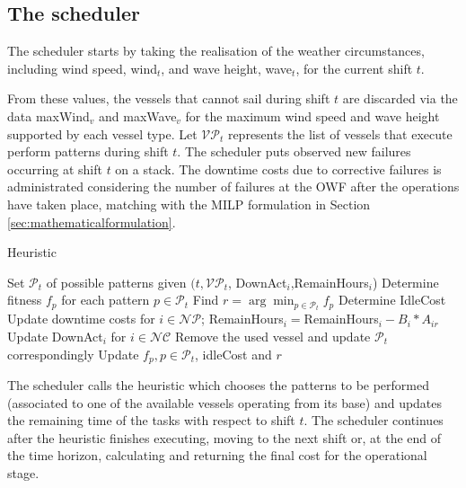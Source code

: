 \subsection{The scheduler}
The scheduler starts by taking the realisation of the weather circumstances, including wind speed, wind$_t$, and wave height, wave$_t$, for the current shift $t$. 


From these values, the vessels that cannot sail during shift $t$ are discarded via the data maxWind$_v$ and maxWave$_v$ for the maximum wind speed and wave height supported by each vessel type. Let $\mathcal{VP}_t$ represents the list of vessels that execute perform patterns during shift $t$. The scheduler puts observed new failures occurring at shift $t$ on a stack. The downtime costs due to corrective failures is administrated considering the number of failures at the OWF after the operations have taken place, matching with the MILP formulation in Section \ref{sec:mathematicalformulation}.

\begin{algorithm}[h]
	\caption{Heuristic}
	\label{alg:heuristic}
	\begin{algorithmic}
		\medskip

			\STATE Set $\mathcal{P}_t$ of possible patterns 
			given $(t,\mathcal{VP}_t$,  DownAct$_i$,RemainHours$_i$)\label{alg:line:allpatcosts}
			\STATE Determine fitness $f_p$ for each pattern $p \in\mathcal{P}_t$
			\STATE Find $r=\arg\min_{p\in \mathcal{P}_t} f_p$
			\STATE Determine IdleCost
				\STATE Update downtime costs for $i \in \mathcal{NP}$;
				\STATE RemainHours$_i = $RemainHours$_i -B_i*A_{ir}$
				\STATE Update DownAct$_i$ for $i\in \mathcal{NC}$
				\STATE Remove the used vessel and update $\mathcal{P}_t$ correspondingly
				\STATE Update $f_p, p\in \mathcal{P}_t$, idleCost and $r$
				\ENDFOR
			\ENDWHILE

		\vskip 5pt
	\end{algorithmic}
\end{algorithm}
The scheduler calls the heuristic which chooses the patterns to be performed (associated to one of the available vessels operating from its base) and updates the remaining time of the tasks with respect to shift $t$. The scheduler continues after the heuristic finishes executing, moving to the next shift or, at the end of the time horizon, calculating and returning the final cost for the operational stage. 



